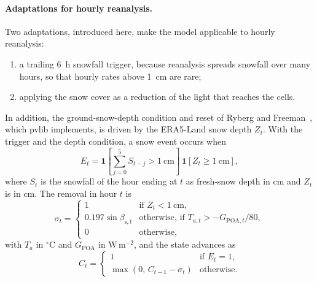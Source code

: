\documentclass[11pt]{article}
\begin{document}
\paragraph{Adaptations for hourly reanalysis.}
Two adaptations, introduced here, make the model applicable to hourly reanalysis:
\begin{enumerate}[label=(\roman*), leftmargin=*, itemsep=1pt, topsep=3pt]
    \item a trailing 6~h snowfall trigger, because reanalysis spreads snowfall over many hours, so that hourly rates above 1~cm are rare;
    \item applying the snow cover as a reduction of the light that reaches the cells.
\end{enumerate}
In addition, the ground-snow-depth condition and reset of Ryberg and Freeman~\cite{rybergIntegrationValidationApplication2017}, which pvlib implements, is driven by the ERA5-Land snow depth $Z_t$. With the trigger and the depth condition, a snow event occurs when
\begin{equation}
E_t=\mathbf{1}\left[\sum_{j=0}^{5}S_{t-j}>1~\mathrm{cm}\right]\,\mathbf{1}\left[Z_t\geq1~\mathrm{cm}\right],
\label{eq:snow_trigger}
\end{equation}
where $S_t$ is the snowfall of the hour ending at $t$ as fresh-snow depth in cm and $Z_t$ is in cm. The removal in hour $t$ is
\begin{equation}
\sigma_t=\begin{cases}1 & \text{if } Z_t<1~\mathrm{cm},\\
0.197\sin\beta_{\mathrm{s},t} & \text{otherwise, if } T_{a,t}>-G_{\mathrm{POA},t}/80,\\
0 & \text{otherwise},\end{cases}
\label{eq:snow_reset}
\end{equation}
with $T_a$ in $^{\circ}$C and $G_{\mathrm{POA}}$ in W\,m$^{-2}$, and the state advances as
\begin{equation}
C_t=\begin{cases}1 & \text{if } E_t=1,\\ \max\left(0,\,C_{t-1}-\sigma_t\right) & \text{otherwise}.\end{cases}
\label{eq:snow_state}
\end{equation}
\end{document}
